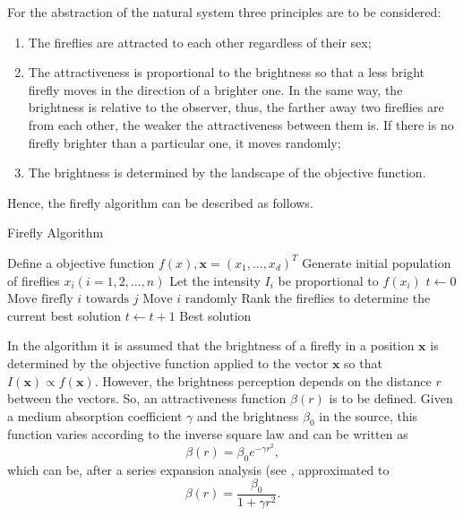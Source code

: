 \documentclass[tuberlin,cic,tc,openright,english,noabntcite,oneside]{iiufrgs}
\begin{document}
For the abstraction of the natural system three principles are to be considered:
\begin{enumerate}
	\item The fireflies are attracted to each other regardless of their sex;
	\item The attractiveness is proportional to the brightness so that a less bright firefly moves in the direction of a brighter one. In the same way, the brightness is relative to the observer, thus, the farther away two fireflies are from each other, the weaker the attractiveness between them is. If there is no firefly brighter than a particular one, it moves randomly;
	\item The brightness is determined by the landscape of the objective function.
\end{enumerate}

Hence, the firefly algorithm can be described as follows.
\begin{algorithm}[H]
\caption{Firefly Algorithm}
\begin{algorithmic}
\State Define a objective function $f(x), \mathbf{x}=(x_{1},...,x_{d})^{T}$
\State Generate initial population of fireflies $x_{i}(i=1,2,...,n)$
\State Let the intensity $I_{i}$ be proportional to $f(x_{i})$
\State $t \gets 0$
				\State $\text{Move firefly }i\text{ towards }j$
			\EndIf
		\EndFor
	\EndFor
		\State $\text{Move }i\text{ randomly}$
	\EndIf
	\State Rank the fireflies to determine the current best solution
	\State $t \gets t + 1$
\EndWhile
\State \Return Best solution
\EndFunction
\end{algorithmic}
\end{algorithm}

In the algorithm it is assumed that the brightness of a firefly in a position $\mathbf{x}$ is determined by the objective function applied to the vector $\mathbf{x}$ so that $I(\mathbf{x}) \propto f(\mathbf{x})$. However, the brightness perception depends on the distance $r$ between the vectors. So, an attractiveness function $\beta(r)$ is to be defined. Given a medium absorption coefficient $\gamma$ and the brightness $\beta_{0}$ in the source, this function varies according to the inverse square law and can be written as
$$\beta(r) = \beta_{0}e^{-\gamma r^{2}},$$ which can be, after a series expansion analysis (see \textcite[p. 173]{yang_firefly_2009}, approximated to
$$\beta(r) = \frac{\beta_{0}}{1 + \gamma r^{2}}.$$
\end{document}
